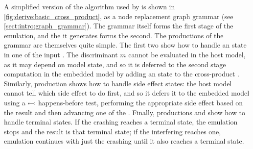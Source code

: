 A simplified version of the algorithm used by {\technique} is shown in
\autoref{fig:derive:basic_cross_product}, as a node replacement graph
grammar (see \autoref{sect:intro:graph_grammar}).  The grammar itself
forms the first stage of the emulation, and the {\StateMachine} it
generates forms the second.  The productions of the grammar are
themselves quite simple.  The first two show how to handle an
 state in one of the input {\StateMachines}.  The
discriminant $m$ cannot be evaluated in the host model, as it may
depend on {\StateMachine} model state, and so it is deferred to the
second stage computation in the embedded model by adding an 
state to the cross-product {\StateMachine}.  Similarly, production
 shows how to handle side effect states: the host model
cannot tell which side effect to do first, and so it defers it to the
embedded model using a $\leftarrowtail$ happens-before test,
performing the appropriate side effect based on the result and then
advancing one of the {\StateMachines}.  Finally, productions
 and  show how to handle terminal states.  If
the crashing {\StateMachine} reaches a terminal state, the emulation
stops and the result is that terminal state; if the interfering
{\StateMachine} reaches one, emulation continues with just the
crashing {\StateMachine} until it also reaches a terminal state.

